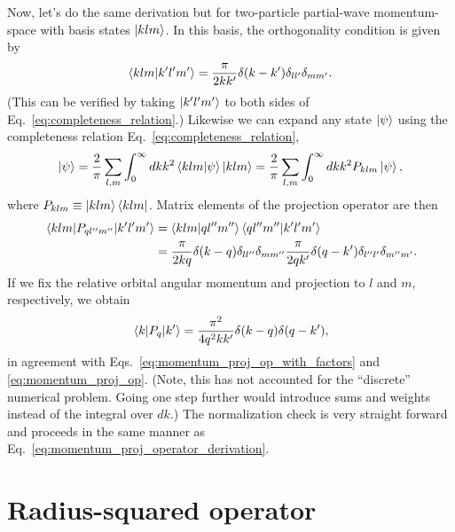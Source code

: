 \documentclass[preprintnumbers,floatfix,aps,prc,preprint,nofootinbib]{revtex4-1}
\begin{document}
Now, let's do the same derivation but for two-particle partial-wave momentum-space with basis states $\ket{klm}$.
In this basis, the orthogonality condition is given by
%
\begin{align}
    \label{eq:orthogonality_ms}
    \bra{klm} \ket{k'l'm'} = \frac{\pi}{2kk'} \delta(k-k') \delta_{ll'} \delta_{mm'}.
\end{align}
%
(This can be verified by taking $\ket{k'l'm'}$ to both sides of Eq.~\eqref{eq:completeness_relation}.)
Likewise we can expand any state $\ket{\psi}$ using the completeness relation Eq.~\eqref{eq:completeness_relation},
%
\begin{align}
    \label{eq:expansion_of_psi_ms}
    \ket{\psi} = \frac{2}{\pi} \sum_{l,m} \int_0^{\infty} dk k^2 \bra{klm} \ket{\psi} \ket{klm} = \frac{2}{\pi} \sum_{l,m} \int_0^{\infty} dk k^2 P_{klm} \ket{\psi},
\end{align}
%
where $P_{klm} \equiv \ket{klm} \bra{klm}$.
Matrix elements of the projection operator are then
%
\begin{align}
    \label{eq:projection_operator_ms_1}
    \mel{klm}{P_{ql''m''}}{k'l'm'} &= \bra{klm} \ket{ql''m''} \bra{ql''m''} \ket{k'l'm'} \nonumber \\
    &= \frac{\pi}{2kq} \delta(k-q) \delta_{ll''} \delta_{mm''} \frac{\pi}{2qk'} \delta(q-k') \delta_{l''l'} \delta_{m''m'}.
\end{align}
%
If we fix the relative orbital angular momentum and projection to $l$ and $m$, respectively, we obtain
%
\begin{align}
    \label{eq:projection_operator_ms_2}
    \mel{k}{P_{q}}{k'} = \frac{\pi^2}{4q^2kk'} \delta(k-q) \delta(q-k'),
\end{align}
%
in agreement with Eqs.~\eqref{eq:momentum_proj_op_with_factors} and \eqref{eq:momentum_proj_op}.
(Note, this has not accounted for the ``discrete'' numerical problem.
Going one step further would introduce sums and weights instead of the integral over $dk$.)
The normalization check is very straight forward and proceeds in the same manner as Eq.~\eqref{eq:momentum_proj_operator_derivation}.
    

\section{Radius-squared operator}
\label{sec:radius_squared_operator}
\end{document}
